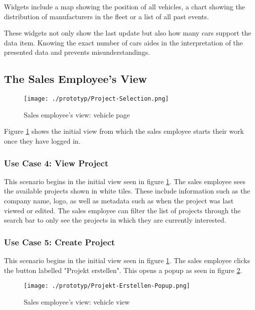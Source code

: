 Widgets include a map showing the position of all vehicles, a chart showing the distribution of manufacturers in the fleet or a list of all past events.

These widgets not only show the last update but also how many cars support the data item. Knowing the exact number of cars aides in the interpretation of the presented data and prevents misunderstandings.

\newpage

\subsection{The Sales Employee's View}
\begin{figure}[ht]
  \centering
  \texttt{[image: ./prototyp/Project-Selection.png]}
  \caption{Sales employee's view: vehicle page}
  \label{Configurator:ProjectSelection}
\end{figure}
Figure \ref{Configurator:ProjectSelection} shows the initial view from which the sales employee starts their work once they have logged in.


\subsubsection{Use Case 4: View Project}
This scenario begins in the initial view seen in figure \ref{Configurator:ProjectSelection}. The sales employee sees the available projects shown in white tiles. These include information such as the company name, logo, as well as metadata such as when the project was last viewed or edited. The sales employee can filter the list of projects through the search bar to only see the projects in which they are currently interested.


\subsubsection{Use Case 5: Create Project}
This scenario begins in the initial view seen in figure \ref{Configurator:ProjectSelection}. The sales employee clicks the button labelled "Projekt erstellen". This opens a popup as seen in figure \ref{Configurator:CreateProjectPopup}. 

\begin{figure}[ht]
  \centering
  \texttt{[image: ./prototyp/Projekt-Erstellen-Popup.png]}
  \caption{Sales employee's view: vehicle view}
  \label{Configurator:CreateProjectPopup}
\end{figure}

